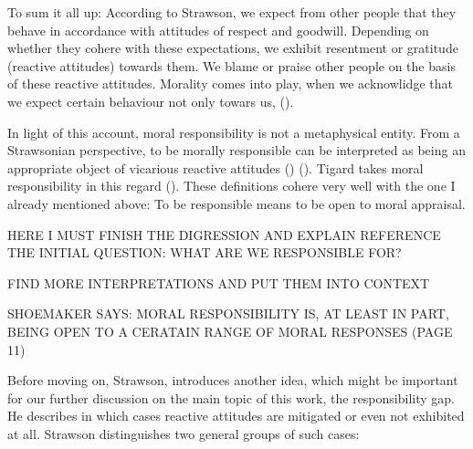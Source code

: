 \documentclass{article}
\begin{document}
To sum it all up: According to Strawson, we expect from other people that they
behave in accordance with attitudes of respect and goodwill. Depending on
whether they cohere with these expectations, we exhibit resentment or gratitude
(reactive attitudes) towards them. We blame or praise other people on the basis
of these reactive attitudes. Morality comes into play, when we acknowlidge that
we expect certain behaviour not only towars us,  (\cite[p.16]{Strawson1962}).

In light of this account, moral responsibility is not a metaphysical entity.
From a Strawsonian perspective, to be morally responsible can be interpreted as
being an appropriate object of vicarious reactive attitudes
(\cite[p.3]{SmithVickers2021}) (\cite[p.175]{Matthias_2004}). Tigard takes moral
responsibility in this regard  (\cite[p.3]{Tigard_2020}). 
These definitions cohere very well with the one I already mentioned above: To be
responsible means to be open to moral appraisal.

HERE I MUST FINISH THE DIGRESSION AND EXPLAIN REFERENCE THE INITIAL QUESTION:
WHAT ARE WE RESPONSIBLE FOR?

FIND MORE INTERPRETATIONS AND PUT THEM
INTO CONTEXT

SHOEMAKER SAYS: MORAL RESPONSIBILITY IS, AT LEAST IN PART, BEING OPEN TO A
CERATAIN RANGE OF MORAL RESPONSES (PAGE 11)


Before moving on, Strawson, introduces another idea, which might be important for
our further discussion on the main topic of this work, the responsibility gap.
He describes in which cases reactive attitudes are mitigated or even not
exhibited at all. Strawson distinguishes two general groups of such cases:
\end{document}

